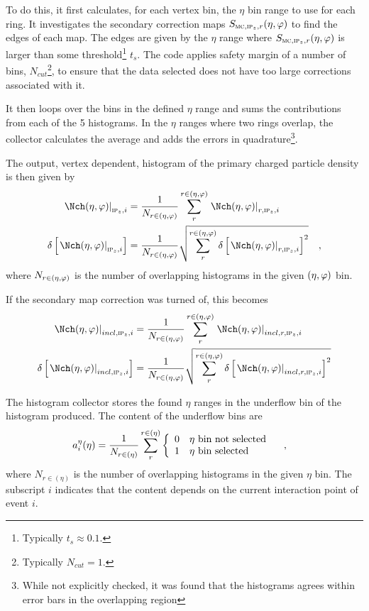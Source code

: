 \documentclass[compat,11pt]{alicenote}
\newcommand*{\etaphi}{\ensuremath(\eta,\varphi)}
\newcommand*\SecMap{\ensuremath S_{\subMC,\subIPz,r}\etaphi}
\newcommand{\dndetadphi}[1][]{{\ensuremath%
    \ifx|#1|\else\left.\fi%
      \Nch\etaphi%
      \ifx|#1|\else\right|_{#1}\fi}}
\newcommand{\etaCov}{\ensuremath a_i^{\eta}(\eta)}
\begin{document}
To do this, it first calculates, for each vertex bin, the $\eta$ bin
range to use for each ring.  It investigates the secondary correction
maps $\SecMap{}$ to find the edges of each map.  The edges are given
by the $\eta$ range where $\SecMap{}$ is larger than some
threshold\footnote{Typically $t_s\approx 0.1$.}  $t_s$. The code
applies safety margin of a number of bins,
$N_{cut}$\footnote{Typically $N_{cut}=1$.}, to ensure that the data
selected does not have too large corrections associated with it.

It then loops over the bins in the defined $\eta$ range and sums the
contributions from each of the 5 histograms.  In the $\eta$ ranges
where two rings overlap, the collector calculates the average and adds
the errors in quadrature\footnote{While not explicitly checked, it was
  found that the histograms agrees within error bars in the
  overlapping region}.

The output, vertex dependent, histogram of the primary
charged particle density is then given by
\begin{align}
  \label{eq:superhist}
  \dndetadphi[\subIPz,i] &=
  \frac{1}{N_{r\in\etaphi}}\sum_{r}^{r\in\etaphi}  
  \dndetadphi[r,\subIPz,i]\\
  \delta\left[\dndetadphi[\subIPz,i]\right] &=
  \frac{1}{N_{r\in\etaphi}}\sqrt{\sum_{r}^{r\in\etaphi}   
    \delta\left[\dndetadphi[r,\subIPz,i]\right]^2}
  \quad,
\end{align}
where $N_{r\in\etaphi}$ is the number of overlapping histograms
in the given $\etaphi$ bin. 

If the secondary map correction was turned of, this becomes 
\begin{align}
  \label{eq:superhist:2}
  \dndetadphi[incl,\subIPz,i] &=
  \frac{1}{N_{r\in\etaphi}}\sum_{r}^{r\in\etaphi}  
  \dndetadphi[incl,r,\subIPz,i]\\
  \delta\left[\dndetadphi[incl,\subIPz,i]\right] &=
  \frac{1}{N_{r\in\etaphi}}\sqrt{\sum_{r}^{r\in\etaphi}   
    \delta\left[\dndetadphi[incl,r,\subIPz,i]\right]^2}
\end{align}

The histogram collector stores the found $\eta$ ranges in the
underflow bin of the histogram produced.  The content of the underflow
bins are 
\begin{align}
  \label{eq:underflow}
  \etaCov &= 
  \frac{1}{N_{r\in(\eta)}}
  \sum_{r}^{r\in(\eta)} \left\{\begin{array}{cl} 
      0 & \eta \text{\ bin not selected}\\ 
      1 & \eta \text{\ bin selected}
      \end{array}\right.\quad,
\end{align}
where $N_{r\in(\eta)}$ is the number of overlapping histograms in the
given $\eta$ bin.  The subscript $i$ indicates that the content
depends on the current interaction point of event $i$.
\end{document}
